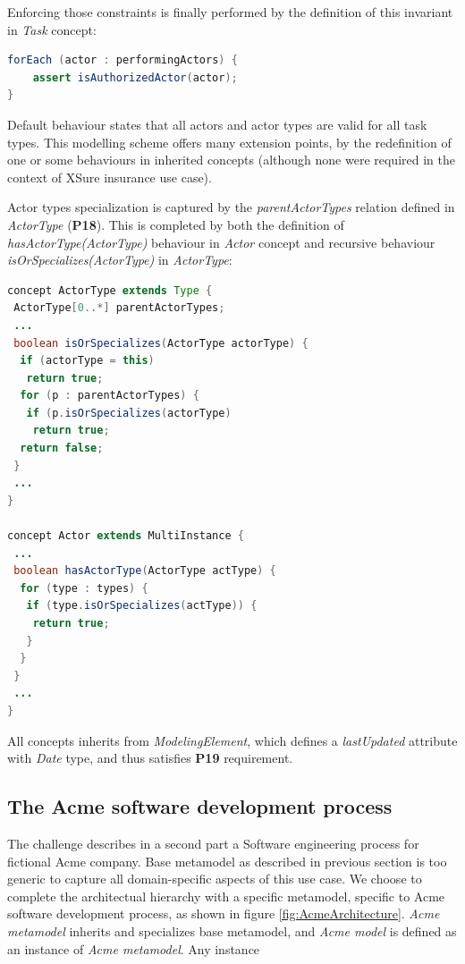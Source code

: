 Enforcing those constraints is finally performed by the definition of this invariant in \textit{Task} concept:

\begin{lstlisting}[breaklines=true, language=java, basicstyle=\ttfamily\scriptsize, mathescape=true]
forEach (actor : performingActors) {
    assert isAuthorizedActor(actor);
}
\end{lstlisting}

Default behaviour states that all actors and actor types are valid for all task types. This modelling scheme offers many extension points, by the redefinition of one or some behaviours in inherited concepts (although none were required in the context of XSure insurance use case).

Actor types specialization is captured by the \textit{parentActorTypes} relation defined in \textit{ActorType} (\textbf{P18}). This is completed by both the definition of \textit{hasActorType(ActorType)} behaviour in \textit{Actor} concept and recursive behaviour \textit{isOrSpecializes(ActorType)} in \textit{ActorType}:

\begin{lstlisting}[breaklines=true, language=java, basicstyle=\ttfamily\scriptsize, mathescape=true]
concept ActorType extends Type {
 ActorType[0..*] parentActorTypes;
 ...
 boolean isOrSpecializes(ActorType actorType) {    
  if (actorType = this)   
   return true;      
  for (p : parentActorTypes) {      
   if (p.isOrSpecializes(actorType)
    return true;        
  return false;    
 }
 ...
}

concept Actor extends MultiInstance {
 ...
 boolean hasActorType(ActorType actType) {      
  for (type : types) {
   if (type.isOrSpecializes(actType)) {
    return true;
   }
  }     
 }  
 ...
}
\end{lstlisting}

All concepts inherits from \textit{ModelingElement}, which defines a \textit{lastUpdated} attribute with \textit{Date} type, and thus satisfies \textbf{P19} requirement. 

\subsection{The Acme software development process}

The challenge describes in a second part a Software engineering process for fictional Acme company. Base metamodel as described in previous section is too generic to capture all domain-specific aspects of this use case. We choose to complete the architectual hierarchy with a specific metamodel, specific to Acme software development process, as shown in figure \ref{fig:AcmeArchitecture}. \textit{Acme metamodel} inherits and specializes base metamodel, and \textit{Acme model} is defined as an instance of \textit{Acme metamodel}. Any instance

